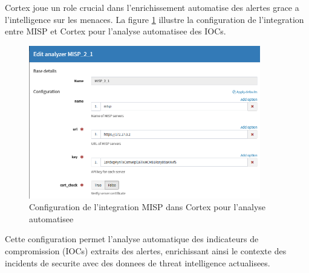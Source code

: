 Cortex joue un role crucial dans l'enrichissement automatise des alertes grace a l'intelligence sur les menaces. La figure \ref{fig:misp_cortex_config} illustre la configuration de l'integration entre MISP et Cortex pour l'analyse automatisee des IOCs.

\begin{figure}[H]
  \centering
  \includegraphics[width=0.9\textwidth]{images/misp_config_in_cortex.png}
  \caption{Configuration de l'integration MISP dans Cortex pour l'analyse automatisee}
  \label{fig:misp_cortex_config}
\end{figure}

Cette configuration permet l'analyse automatique des indicateurs de compromission (IOCs) extraits des alertes, enrichissant ainsi le contexte des incidents de securite avec des donnees de threat intelligence actualisees.

